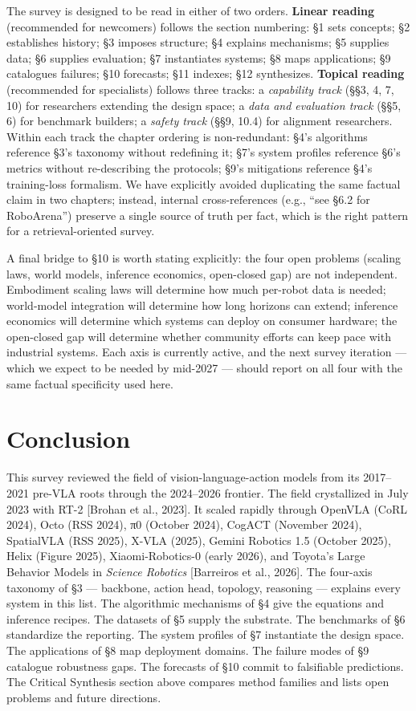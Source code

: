 The survey is designed to be read in either of two orders. \textbf{Linear reading} (recommended for newcomers) follows the section numbering: §1 sets concepts; §2 establishes history; §3 imposes structure; §4 explains mechanisms; §5 supplies data; §6 supplies evaluation; §7 instantiates systems; §8 maps applications; §9 catalogues failures; §10 forecasts; §11 indexes; §12 synthesizes. \textbf{Topical reading} (recommended for specialists) follows three tracks: a \emph{capability track} (§§3, 4, 7, 10) for researchers extending the design space; a \emph{data and evaluation track} (§§5, 6) for benchmark builders; a \emph{safety track} (§§9, 10.4) for alignment researchers. Within each track the chapter ordering is non-redundant: §4's algorithms reference §3's taxonomy without redefining it; §7's system profiles reference §6's metrics without re-describing the protocols; §9's mitigations reference §4's training-loss formalism. We have explicitly avoided duplicating the same factual claim in two chapters; instead, internal cross-references (e.g., ``see §6.2 for RoboArena'') preserve a single source of truth per fact, which is the right pattern for a retrieval-oriented survey.

A final bridge to §10 is worth stating explicitly: the four open problems (scaling laws, world models, inference economics, open-closed gap) are not independent. Embodiment scaling laws will determine how much per-robot data is needed; world-model integration will determine how long horizons can extend; inference economics will determine which systems can deploy on consumer hardware; the open-closed gap will determine whether community efforts can keep pace with industrial systems. Each axis is currently active, and the next survey iteration --- which we expect to be needed by mid-2027 --- should report on all four with the same factual specificity used here.

\section{Conclusion}\label{conclusion}

This survey reviewed the field of vision-language-action models from its 2017--2021 pre-VLA roots through the 2024--2026 frontier. The field crystallized in July 2023 with RT-2 {[}Brohan et al., 2023{]}. It scaled rapidly through OpenVLA (CoRL 2024), Octo (RSS 2024), π0 (October 2024), CogACT (November 2024), SpatialVLA (RSS 2025), X-VLA (2025), Gemini Robotics 1.5 (October 2025), Helix (Figure 2025), Xiaomi-Robotics-0 (early 2026), and Toyota's Large Behavior Models in \emph{Science Robotics} {[}Barreiros et al., 2026{]}. The four-axis taxonomy of §3 --- backbone, action head, topology, reasoning --- explains every system in this list. The algorithmic mechanisms of §4 give the equations and inference recipes. The datasets of §5 supply the substrate. The benchmarks of §6 standardize the reporting. The system profiles of §7 instantiate the design space. The applications of §8 map deployment domains. The failure modes of §9 catalogue robustness gaps. The forecasts of §10 commit to falsifiable predictions. The Critical Synthesis section above compares method families and lists open problems and future directions.

